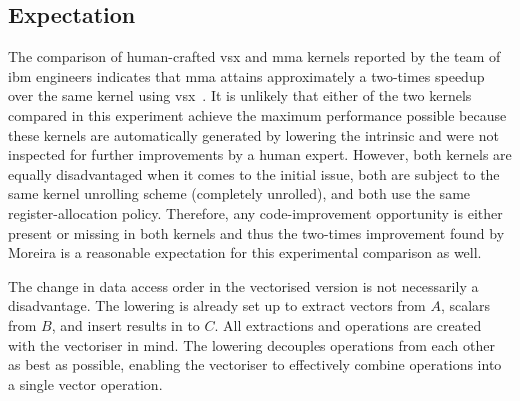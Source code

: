 \documentclass[\main/thesis.tex]{subfiles}
\begin{document}
\subsection{Expectation}
The comparison of human-crafted \gls{vsx} and \gls{mma} kernels reported by the team of \gls{ibm} engineers indicates that \gls{mma} attains approximately a two-times speedup over the same kernel using \gls{vsx}~\autocite{moreira2021matrix}.
It is unlikely that either of the two kernels compared in this experiment achieve the maximum performance possible because these kernels are automatically generated by \gls{lowering} the  \gls{intrinsic} and were not inspected for further improvements by a human expert.
However, both kernels are equally disadvantaged when it comes to the initial  issue, both are subject to the same kernel unrolling scheme (\ie completely unrolled), and both use the same register-allocation policy.
Therefore, any code-improvement opportunity is either present or missing in both kernels and thus the two-times improvement found by Moreira \etal is a reasonable expectation for this experimental comparison as well.

The change in data access order in the vectorised version is not necessarily a disadvantage.
The \gls{lowering} is already set up to extract vectors from $A$, scalars from $B$, and insert results in to $C$.
All extractions and operations are created with the vectoriser in mind.
The \gls{lowering} decouples operations from each other as best as possible, enabling the vectoriser to effectively combine operations into a single vector operation.
\end{document}
